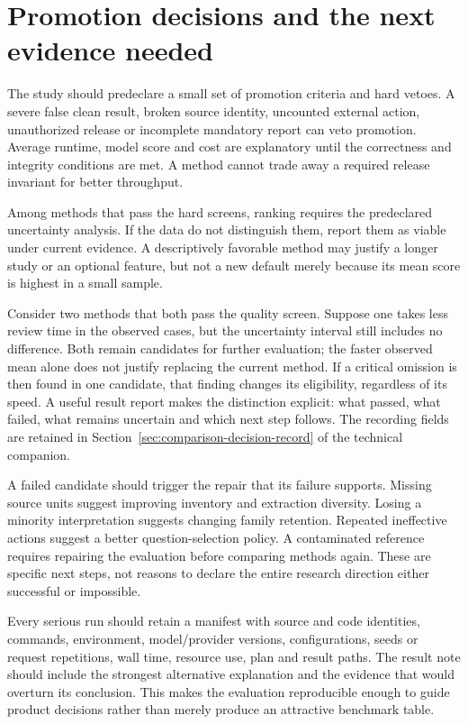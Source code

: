 \section{Promotion decisions and the next evidence needed}
\label{merge:M09:12}


The study should predeclare a small set of promotion criteria and hard vetoes.
A severe false clean result, broken source identity, uncounted external action,
unauthorized release or incomplete mandatory report can veto promotion. Average
runtime, model score and cost are explanatory until the correctness and integrity
conditions are met. A method cannot trade away a required release invariant for
better throughput.

Among methods that pass the hard screens, ranking requires the predeclared
uncertainty analysis. If the data do not distinguish them, report them as viable
under current evidence. A descriptively favorable method may justify a longer
study or an optional feature, but not a new default merely because its mean score
is highest in a small sample.

Consider two methods that both pass the quality screen. Suppose one takes less
review time in the observed cases, but the uncertainty interval still includes
no difference. Both remain candidates for further evaluation; the faster
observed mean alone does not justify replacing the current method. If a critical
omission is then found in one candidate, that finding changes its eligibility,
regardless of its speed. A useful result report makes the distinction explicit:
what passed, what failed, what remains uncertain and which next step follows.
The recording fields are retained in Section~\ref{sec:comparison-decision-record}
of the technical companion.


A failed candidate should trigger the repair that its failure supports. Missing
source units suggest improving inventory and extraction diversity. Losing a
minority interpretation suggests changing family retention. Repeated ineffective
actions suggest a better question-selection policy. A contaminated reference
requires repairing the evaluation before comparing methods again. These are
specific next steps, not reasons to declare the entire research direction either
successful or impossible.

Every serious run should retain a manifest with source and code identities,
commands, environment, model/provider versions, configurations, seeds or request
repetitions, wall time, resource use, plan and result paths. The result note should
include the strongest alternative explanation and the evidence that would overturn
its conclusion. This makes the evaluation reproducible enough to guide product
decisions rather than merely produce an attractive benchmark table.

